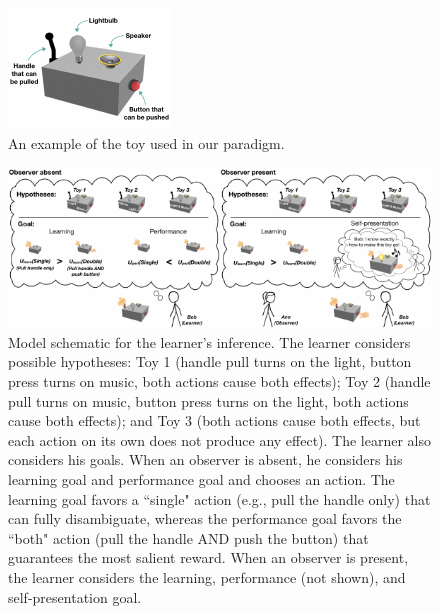 \documentclass[10pt, letterpaper]{article}
\newenvironment{CodeChunk}{}{}
\begin{document}
\begin{CodeChunk}
\begin{figure}[b]

{\centering \includegraphics[width=0.65\linewidth]{figs/toy-1} 

}

\caption[An example of the toy used in our paradigm]{An example of the toy used in our paradigm.}\label{fig:toy}
\end{figure}
\end{CodeChunk}

\begin{CodeChunk}
\begin{figure}[tb]

{\centering \includegraphics[width=0.95\linewidth]{figs/model_diagram-1} 

}

\caption[Model schematic for the learner's inference]{Model schematic for the learner's inference. The learner considers possible hypotheses: Toy 1 (handle pull turns on the light, button press turns on music, both actions cause both effects); Toy 2 (handle pull turns on music, button press turns on the light, both actions cause both effects); and Toy 3 (both actions cause both effects, but each action on its own does not produce any effect). The learner also considers his goals. When an observer is absent, he considers his learning goal and performance goal and chooses an action. The learning goal favors a ``single" action (e.g., pull the handle only) that can fully disambiguate, whereas the performance goal favors the ``both" action (pull the handle AND push the button) that guarantees the most salient reward. When an observer is present, the learner considers the learning, performance (not shown), and self-presentation goal.}\label{fig:model_diagram}
\end{figure}
\end{CodeChunk}
\end{document}
